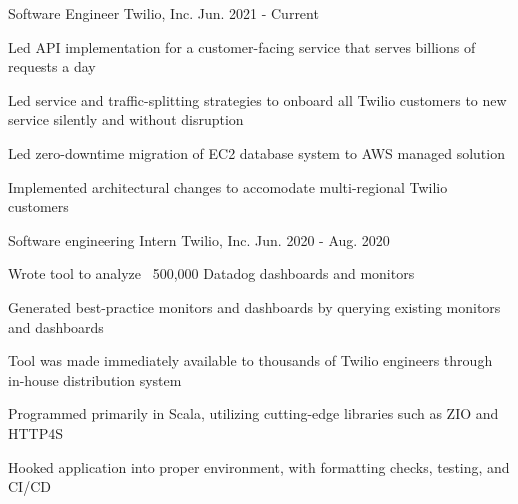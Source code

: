 

\begin{cventries}


  \cventry
    {Software Engineer} %
    {Twilio, Inc.} %
    {} %
    {Jun. 2021 - Current} %
    {
      \begin{cvitems} %
      \item {Led API implementation for a customer-facing service that serves billions of requests a day}
      \item {Led service and traffic-splitting strategies to onboard all Twilio customers to new service silently and without disruption}
      \item {Led zero-downtime migration of EC2 database system to AWS managed solution}
      \item {Implemented architectural changes to accomodate multi-regional Twilio customers}
      \end{cvitems}
    }

  \cventry
    {Software engineering Intern} %
    {Twilio, Inc.} %
    {} %
    {Jun. 2020 - Aug. 2020} %
    {
      \begin{cvitems} %
        \item {Wrote tool to analyze ~500,000 Datadog dashboards and monitors}
        \item {Generated best-practice monitors and dashboards by querying existing monitors and dashboards}
        \item {Tool was made immediately available to thousands of Twilio engineers through in-house distribution system}
        \item {Programmed primarily in Scala, utilizing cutting-edge libraries such as ZIO and HTTP4S}
        \item {Hooked application into proper environment, with formatting checks, testing, and CI/CD}
        \end{cvitems}
    }


\end{cventries}
